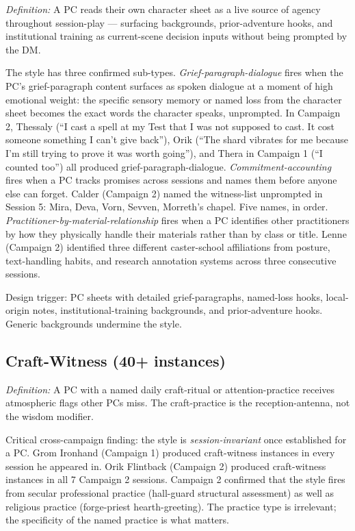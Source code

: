 \textit{Definition:} A PC reads their own character sheet as a live source of agency
throughout session-play --- surfacing backgrounds, prior-adventure hooks, and
institutional training as current-scene decision inputs without being prompted by the DM.

The style has three confirmed sub-types. \textit{Grief-paragraph-dialogue} fires when
the PC's grief-paragraph content surfaces as spoken dialogue at a moment of high
emotional weight: the specific sensory memory or named loss from the character sheet
becomes the exact words the character speaks, unprompted. In Campaign 2, Thessaly
(``I cast a spell at my Test that I was not supposed to cast. It cost someone something
I can't give back''), Orik (``The shard vibrates for me because I'm still trying to
prove it was worth going''), and Thera in Campaign 1 (``I counted too'') all produced
grief-paragraph-dialogue. \textit{Commitment-accounting} fires when a PC tracks
promises across sessions and names them before anyone else can forget. Calder
(Campaign 2) named the witness-list unprompted in Session 5: Mira, Deva, Vorn, Sevven,
Morreth's chapel. Five names, in order. \textit{Practitioner-by-material-relationship}
fires when a PC identifies other practitioners by how they physically handle their
materials rather than by class or title. Lenne (Campaign 2) identified three different
caster-school affiliations from posture, text-handling habits, and research annotation
systems across three consecutive sessions.

Design trigger: PC sheets with detailed grief-paragraphs, named-loss hooks, local-origin
notes, institutional-training backgrounds, and prior-adventure hooks. Generic backgrounds
undermine the style.

\subsection{Craft-Witness (40+ instances)}

\textit{Definition:} A PC with a named daily craft-ritual or attention-practice
receives atmospheric flags other PCs miss. The craft-practice is the reception-antenna,
not the wisdom modifier.

Critical cross-campaign finding: the style is \textit{session-invariant} once
established for a PC. Grom Ironhand (Campaign 1) produced craft-witness instances in
every session he appeared in. Orik Flintback (Campaign 2) produced craft-witness
instances in all 7 Campaign 2 sessions. Campaign 2 confirmed that the style fires from
secular professional practice (hall-guard structural assessment) as well as religious
practice (forge-priest hearth-greeting). The practice type is irrelevant; the specificity
of the named practice is what matters.

